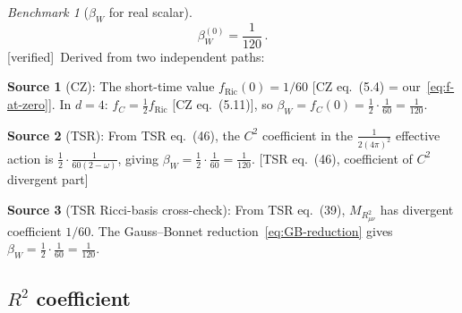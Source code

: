 \documentclass[12pt,a4paper]{article}
\theoremstyle{definition}
\theoremstyle{remark}
\newtheorem{benchmark}[proposition]{Benchmark}
\newcommand{\fromlit}[1]{\textcolor{blue!70!black}{\textsf{[#1]}}}
\newcommand{\verified}{\textcolor{green!50!black}{\textsf{[verified]}}}
\begin{document}
\begin{benchmark}[$\beta_W$ for real scalar]
\label{bench:beta-W}
\begin{equation}
  \boxed{
  \beta_W^{(0)} = \frac{1}{120}\,.
  }
  \label{eq:beta-W-scalar}
\end{equation}
\verified\ Derived from two independent paths:

\medskip\noindent
\textbf{Source 1} (CZ): The short-time value $f_{\mathrm{Ric}}(0) = 1/60$
\fromlit{CZ eq.~(5.4) = our~\eqref{eq:f-at-zero}}.
In $d=4$: $f_C = \frac{1}{2}f_{\mathrm{Ric}}$
\fromlit{CZ eq.~(5.11)}, so
$\beta_W = f_C(0) = \frac{1}{2}\cdot\frac{1}{60} = \frac{1}{120}$.

\medskip\noindent
\textbf{Source 2} (TSR): From TSR eq.~(46), the $C^2$
coefficient in the $\frac{1}{2(4\pi)^2}$ effective action is
$\frac{1}{2}\cdot\frac{1}{60(2-\omega)}$, giving
$\beta_W = \frac{1}{2}\cdot\frac{1}{60} = \frac{1}{120}$.
\fromlit{TSR eq.~(46), coefficient of $C^2$ divergent part}

\medskip\noindent
\textbf{Source 3} (TSR Ricci-basis cross-check):
From TSR eq.~(39), $M_{R_{\mu\nu}^2}$ has divergent coefficient
$1/60$.  The Gauss--Bonnet reduction~\eqref{eq:GB-reduction} gives
$\beta_W = \frac{1}{2}\cdot\frac{1}{60} = \frac{1}{120}$.
\end{benchmark}

\subsection{$R^2$ coefficient}
\end{document}
